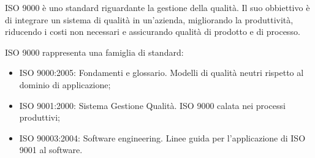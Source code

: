 ISO 9000 è uno standard riguardante la gestione della qualità. Il suo obbiettivo
è di integrare un sistema di qualità in un'azienda, migliorando la produttività,
riducendo i costi non necessari e assicurando qualità di prodotto e di processo.

ISO 9000 rappresenta una famiglia di standard:

\begin{itemize}
  \item ISO 9000:2005: Fondamenti e glossario. Modelli di qualità neutri
    rispetto al dominio di applicazione;
  \item ISO 9001:2000: Sistema Gestione Qualità. ISO 9000 calata nei processi
    produttivi;
  \item ISO 90003:2004: Software engineering. Linee guida per l'applicazione di
    ISO 9001 al software.
\end{itemize}
